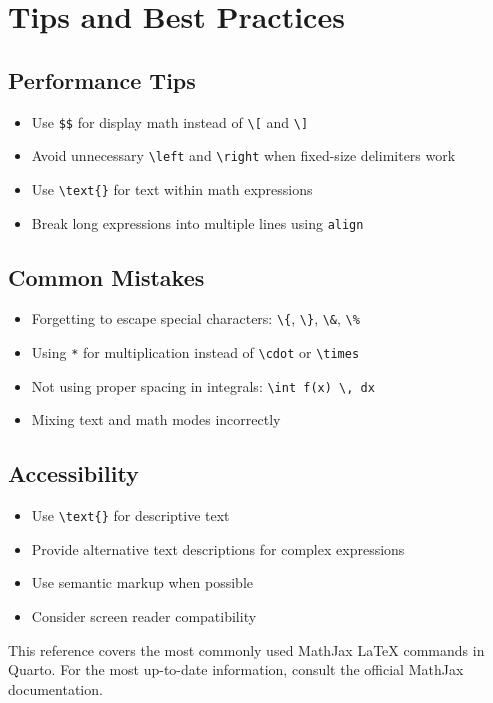 \documentclass[
  letterpaper,
  DIV=11,
  numbers=noendperiod]{scrartcl}
\providecommand{\tightlist}{%
  \setlength{\itemsep}{0pt}\setlength{\parskip}{0pt}}\usepackage{longtable,booktabs,array}
\begin{document}
\hypertarget{tips-and-best-practices}{%
\section{Tips and Best Practices}\label{tips-and-best-practices}}

\hypertarget{performance-tips}{%
\subsection{Performance Tips}\label{performance-tips}}

\begin{itemize}
\tightlist
\item
  Use \texttt{\$\$} for display math instead of
  \texttt{\textbackslash{}{[}} and \texttt{\textbackslash{}{]}}
\item
  Avoid unnecessary \texttt{\textbackslash{}left} and
  \texttt{\textbackslash{}right} when fixed-size delimiters work
\item
  Use \texttt{\textbackslash{}text\{\}} for text within math expressions
\item
  Break long expressions into multiple lines using \texttt{align}
\end{itemize}

\hypertarget{common-mistakes}{%
\subsection{Common Mistakes}\label{common-mistakes}}

\begin{itemize}
\tightlist
\item
  Forgetting to escape special characters: \texttt{\textbackslash{}\{},
  \texttt{\textbackslash{}\}}, \texttt{\textbackslash{}\&},
  \texttt{\textbackslash{}\%}
\item
  Using \texttt{*} for multiplication instead of
  \texttt{\textbackslash{}cdot} or \texttt{\textbackslash{}times}
\item
  Not using proper spacing in integrals:
  \texttt{\textbackslash{}int\ f(x)\ \textbackslash{},\ dx}
\item
  Mixing text and math modes incorrectly
\end{itemize}

\hypertarget{accessibility}{%
\subsection{Accessibility}\label{accessibility}}

\begin{itemize}
\tightlist
\item
  Use \texttt{\textbackslash{}text\{\}} for descriptive text
\item
  Provide alternative text descriptions for complex expressions
\item
  Use semantic markup when possible
\item
  Consider screen reader compatibility
\end{itemize}

This reference covers the most commonly used MathJax LaTeX commands in
Quarto. For the most up-to-date information, consult the official
MathJax documentation.
\end{document}
